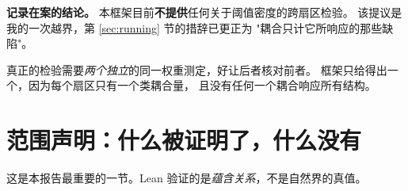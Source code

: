 \documentclass[11pt,a4paper]{article}
\theoremstyle{sudef}
\begin{document}
\begin{mdframed}[linecolor=axcol,linewidth=0.9pt,backgroundcolor=axcol!4]
\textbf{记录在案的结论。} 本框架目前\textbf{不提供}任何关于阈值密度的跨扇区检验。
该提议是我的一次越界，第 \ref{sec:running} 节的措辞已更正为
"耦合只计它所响应的那些缺陷"。

真正的检验需要\emph{两个独立}的同一权重测定，好让后者核对前者。
框架只给得出一个，因为每个扇区只有一个类耦合量，
且没有任何一个耦合响应所有结构。
\end{mdframed}

\clearpage
\section{范围声明：什么被证明了，什么没有}\label{sec:scope}

这是本报告最重要的一节。Lean 验证的是\emph{蕴含关系}，不是自然界的真值。
\end{document}
